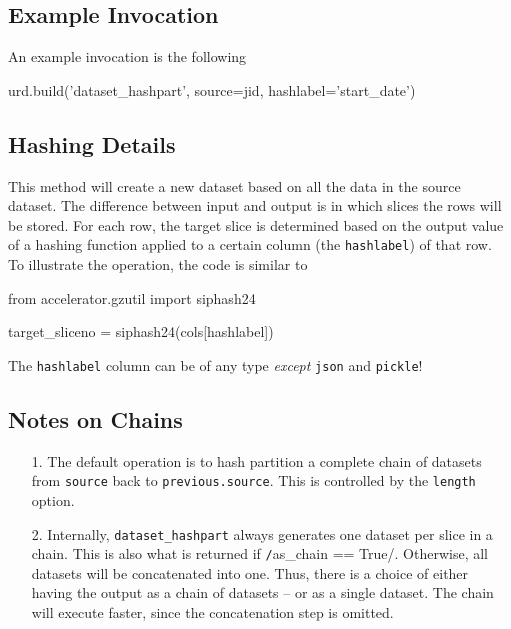 \subsection{Example Invocation}
An example invocation is the following
\begin{python}
urd.build('dataset_hashpart', source=jid, hashlabel='start_date')
\end{python}


\subsection{Hashing Details}
This method will create a new dataset based on all the data in the
source dataset.  The difference between input and output is in which
slices the rows will be stored.  For each row, the target slice is
determined based on the output value of a hashing function applied to
a certain column (the \texttt{hashlabel}) of that row.  To illustrate
the operation, the code is similar to
\begin{python}
from accelerator.gzutil import siphash24

target_sliceno = siphash24(cols[hashlabel]) %
\end{python}
The \texttt{hashlabel} column can be of any type \textsl{except} \texttt{json}
and \texttt{pickle}!


\subsection{Notes on Chains}
\begin{enumerate}
  \item[1.]  The default operation is to hash partition a complete
    chain of datasets from \texttt{source} back to
    \texttt{previous.source}.  This is controlled by the
    \texttt{length} option.

  \item[2.]  Internally, \texttt{dataset\_hashpart} always
    generates one dataset per slice in a chain.  This is also what is
    returned if \texttt/as_chain == True/.  Otherwise, all
    datasets will be concatenated into one.  Thus, there is a choice
    of either having the output as a chain of datasets -- or as a
    single dataset.  The chain will execute faster, since the
    concatenation step is omitted.
\end{enumerate}


